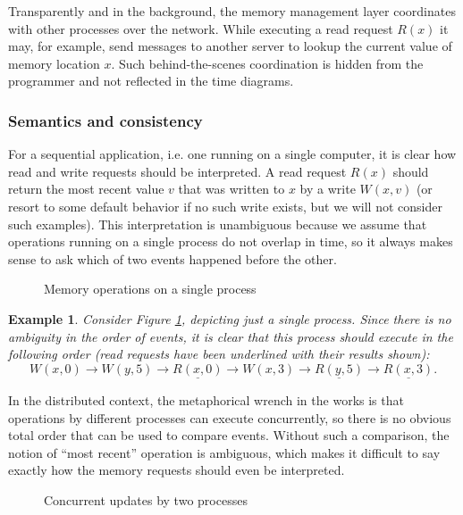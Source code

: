 \documentclass[]             %
{NASA}                       %
\newtheorem{example}{Example}
\theoremstyle{definition}
\begin{document}
Transparently and in the background, the memory management layer
coordinates with other processes over the network. While executing a
read request $R(x)$ it may, for example, send messages to another
server to lookup the current value of memory location $x$. Such
behind-the-scenes coordination is hidden from the programmer and not
reflected in the time diagrams.

\subsubsection{Semantics and consistency}

For a sequential application, i.e. one running on a single computer,
it is clear how read and write requests should be interpreted. A read
request $R(x)$ should return the most recent value $v$ that was
written to $x$ by a write $W(x, v)$ (or resort to some default
behavior if no such write exists, but we will not consider such
examples). This interpretation is unambiguous because we assume that
operations running on a single process do not overlap in time, so it
always makes sense to ask which of two events happened before the
other.
\begin{figure}
  
  \caption{Memory operations on a single process}
  \label{fig:smEx0}
\end{figure}

\begin{example}
  \label{exmpl:updatesoneprocess}
  Consider Figure \ref{fig:smEx0}, depicting just a single process. Since there is
  no ambiguity in the order of events, it is clear that this process
  should execute in the following order (read requests have been underlined with their results shown):
  \[ W(x, 0) \to W(y, 5) \to \underline{R(x, 0)} \to W(x, 3) \to \underline{R(y, 5)} \to \underline{R(x, 3)}. \]
\end{example}

In the distributed context, the metaphorical wrench in the works is
that operations by different processes can execute concurrently, so
there is no obvious total order that can be used to compare
events. Without such a comparison, the notion of ``most recent''
operation is ambiguous, which makes it difficult to say exactly how
the memory requests should even be interpreted.

\begin{figure}
  
  \caption{Concurrent updates by two processes}
  \label{fig:smEx2}
\end{figure}
\end{document}
